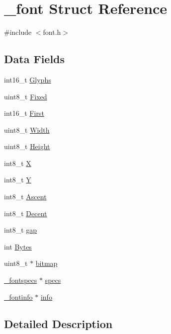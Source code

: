 \hypertarget{struct__font}{\section{\-\_\-font Struct Reference}
\label{struct__font}
}


{\ttfamily \#include $<$font.\-h$>$}

\subsection*{Data Fields}
\begin{DoxyCompactItemize}
\item 
int16\-\_\-t \hyperlink{struct__font_a1e89c06fc11a730eb602522dc8953491}{Glyphs}
\item 
uint8\-\_\-t \hyperlink{struct__font_a76218c6b35acb78926429f247cbaa687}{Fixed}
\item 
int16\-\_\-t \hyperlink{struct__font_a73decb2a2c2880dc782cd9cda5561876}{First}
\item 
uint8\-\_\-t \hyperlink{struct__font_ae3d3b48670f1bf4bf6dbf42794f81b31}{Width}
\item 
uint8\-\_\-t \hyperlink{struct__font_a5888921d1a78bf917351a275e2033467}{Height}
\item 
int8\-\_\-t \hyperlink{struct__font_a64a08fdbdaa19418a9b7a34a2db33150}{X}
\item 
int8\-\_\-t \hyperlink{struct__font_a3c9fee9cfcc713b1aac812c14dd9a36a}{Y}
\item 
int8\-\_\-t \hyperlink{struct__font_a998e54724f56879aa85c5ec169873f39}{Ascent}
\item 
int8\-\_\-t \hyperlink{struct__font_a7f3567884a6aa454b7414b10dba35755}{Decent}
\item 
int8\-\_\-t \hyperlink{struct__font_af4d840b8e62f6a0548cef0a5474416f4}{gap}
\item 
int \hyperlink{struct__font_a13b0b0e4e91f4d663ba4c3c11bfbda8a}{Bytes}
\item 
uint8\-\_\-t $\ast$ \hyperlink{struct__font_a336f543c3fe3d3197c6e709fa7df0f5b}{bitmap}
\item 
\hyperlink{struct__fontspecs}{\-\_\-fontspecs} $\ast$ \hyperlink{struct__font_a76b5b07cf75a869627eca27d7a32836a}{specs}
\item 
\hyperlink{struct__fontinfo}{\-\_\-fontinfo} $\ast$ \hyperlink{struct__font_abf134e8a44e707d3b4e83ab76c952ed9}{info}
\end{DoxyCompactItemize}


\subsection{Detailed Description}


